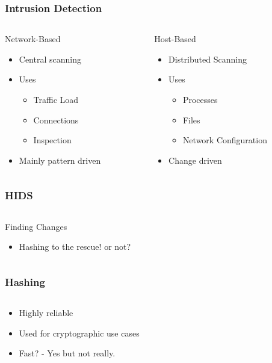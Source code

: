 \documentclass{beamer}
\begin{document}
\begin{frame}[fragile]
  \frametitle{Intrusion Detection}
  \begin{columns}
    \begin{column}{0.5\textwidth}
      Network-Based
      \begin{itemize}
        \item Central scanning
        \item Uses
        \begin{itemize}
          \item Traffic Load
          \item Connections
          \item Inspection
        \end{itemize}
        \item Mainly pattern driven
      \end{itemize}
    \end{column}
    \begin{column}{0.5\textwidth}
      Host-Based
      \begin{itemize}
        \item Distributed Scanning 
        \item Uses
        \begin{itemize}
          \item Processes
          \item Files
          \item Network Configuration
        \end{itemize}
        \item Change driven
      \end{itemize}
    \end{column}
  \end{columns}
\end{frame}

\begin{frame}[fragile]
  \frametitle{HIDS}
  \begin{columns}
    \begin{column}{1\textwidth}
      Finding Changes
      \begin{itemize}
        \item Hashing to the rescue! \pause or not?
      \end{itemize}
    \end{column}
  \end{columns}
\end{frame}

\begin{frame}[fragile]
  \frametitle{Hashing}
  \begin{columns}
    \begin{column}{1\textwidth}
      \begin{itemize}
        \item Highly reliable
        \item Used for cryptographic use cases
        \item Fast? \pause - Yes but not really.
      \end{itemize}
    \end{column}
  \end{columns}
\end{frame}
\end{document}
